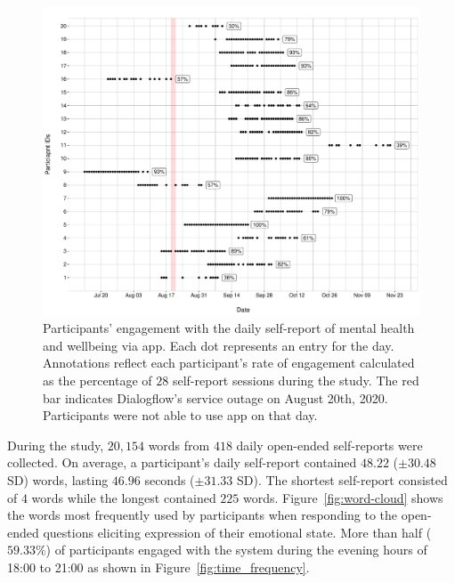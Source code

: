             \begin{figure}[h]
                \centering
                \includegraphics[clip, trim=0cm 0cm 0.15cm 0cm, width=\textwidth]{figures/engagement.pdf}
                \caption{Participants' engagement with the daily self-report of mental health and wellbeing via \acl{app}. Each dot represents an entry for the day. Annotations reflect each participant's rate of engagement calculated as the percentage of $28$ self-report sessions during the study. The red bar indicates Dialogflow's service outage on August 20th, 2020. Participants were not able to use \acl{app} on that day.}
                \label{fig:engagement}
            \end{figure}
                
        During the study, $20,154$ words from $418$ daily open-ended self-reports were collected. On average, a participant's daily self-report contained $48.22$ ($\pm 30.48$ SD) words, lasting $46.96$ seconds ($\pm 31.33$ SD). The shortest self-report consisted of $4$ words while the longest contained $225$ words. Figure~\ref{fig:word-cloud} shows the words most frequently used by participants when responding to the open-ended questions eliciting expression of their emotional state. More than half ($59.33\%$) of participants engaged with the system during the evening hours of 18:00 to 21:00 as shown in Figure~\ref{fig:time_frequency}.
            
